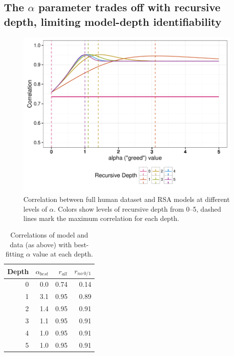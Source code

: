 \documentclass[man,noapacite]{apa2}
\begin{document}
\subsection{The $\alpha$ parameter trades off with recursive depth, limiting model-depth identifiability}

\begin{figure}[t]
 \centering
 \includegraphics[width=5in]{../plots/alpha-fit.pdf}
 \caption{\label{fig:alpha-fit} Correlation between full human dataset and RSA models at different levels of $\alpha$. Colors show levels of recursive depth from 0--5, dashed lines mark the maximum correlation for each depth.}
\end{figure}

\begin{table}[ht]
\centering
\begin{tabular}{rrrr}
  \hline
Depth & $\alpha_{best}$ & $r_{all}$ & $r_{no~0/1}$ \\
  \hline
  0 & 0.0 & 0.74 & 0.14 \\
    1 & 3.1 & 0.95 & 0.89 \\
    2 & 1.4 & 0.95 & 0.91 \\
    3 & 1.1 & 0.95 & 0.91 \\
    4 & 1.0 & 0.95 & 0.91 \\
    5 & 1.0 & 0.95 & 0.91 \\
   \hline
\end{tabular}
\caption{\label{tab:corrs-fita} Correlations of model and data (as above) with best-fitting $\alpha$ value at each depth.}
\end{table}
\end{document}
